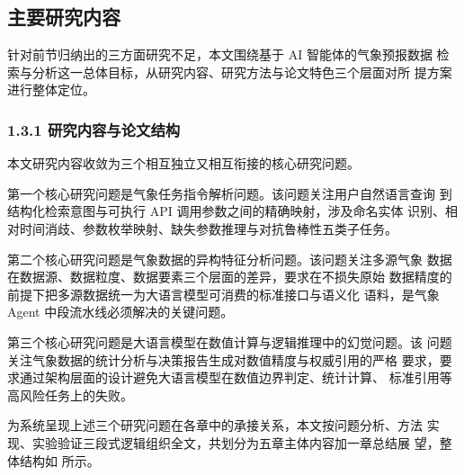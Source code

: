 
\subsection{主要研究内容}
\label{sec:research-content}

针对前节归纳出的三方面研究不足，本文围绕基于 AI 智能体的气象预报数据
检索与分析这一总体目标，从研究内容、研究方法与论文特色三个层面对所
提方案进行整体定位。

\subsubsection*{1.3.1 \quad 研究内容与论文结构}

本文研究内容收敛为三个相互独立又相互衔接的核心研究问题。

第一个核心研究问题是气象任务指令解析问题。该问题关注用户自然语言查询
到结构化检索意图与可执行 API 调用参数之间的精确映射，涉及命名实体
识别、相对时间消歧、参数枚举映射、缺失参数推理与对抗鲁棒性五类子任务。

第二个核心研究问题是气象数据的异构特征分析问题。该问题关注多源气象
数据在数据源、数据粒度、数据要素三个层面的差异，要求在不损失原始
数据精度的前提下把多源数据统一为大语言模型可消费的标准接口与语义化
语料，是气象 Agent 中段流水线必须解决的关键问题。

第三个核心研究问题是大语言模型在数值计算与逻辑推理中的幻觉问题。该
问题关注气象数据的统计分析与决策报告生成对数值精度与权威引用的严格
要求，要求通过架构层面的设计避免大语言模型在数值边界判定、统计计算、
标准引用等高风险任务上的失败。

为系统呈现上述三个研究问题在各章中的承接关系，本文按问题分析、方法
实现、实验验证三段式逻辑组织全文，共划分为五章主体内容加一章总结展
望，整体结构如  所示。

